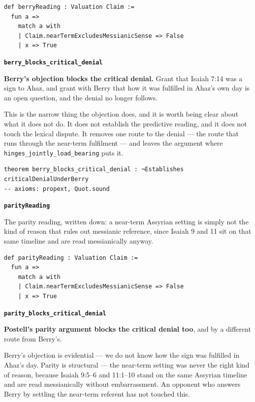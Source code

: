 \documentclass[11pt]{article}
\begin{document}
{\small\begin{verbatim}
def berryReading : Valuation Claim :=
  fun a =>
    match a with
    | Claim.nearTermExcludesMessianicSense => False
    | x => True
\end{verbatim}}
\par\medskip\noindent\textbf{\texttt{berry\_\allowbreak{}blocks\_\allowbreak{}critical\_\allowbreak{}denial}}\par\nobreak\noindent
\textbf{Berry's objection blocks the critical denial.} Grant that Isaiah 7:14 was a sign to Ahaz, and grant with Berry that how it was fulfilled in Ahaz's own day is an open question, and the denial no longer follows.

This is the narrow thing the objection does, and it is worth being clear about what it does not do. It does not establish the predictive reading, and it does not touch the lexical dispute. It removes one route to the denial — the route that runs through the near-term fulfilment — and leaves the argument where \texttt{hinges\_\allowbreak{}jointly\_\allowbreak{}load\_\allowbreak{}bearing} puts it.

{\small\begin{verbatim}
theorem berry_blocks_critical_denial : ¬Establishes criticalDenialUnderBerry
-- axioms: propext, Quot.sound
\end{verbatim}}
\par\medskip\noindent\textbf{\texttt{parity\allowbreak{}Reading}}\par\nobreak\noindent
The parity reading, written down: a near-term Assyrian setting is simply not the kind of reason that rules out messianic reference, since Isaiah 9 and 11 sit on that same timeline and are read messianically anyway.

{\small\begin{verbatim}
def parityReading : Valuation Claim :=
  fun a =>
    match a with
    | Claim.nearTermExcludesMessianicSense => False
    | x => True
\end{verbatim}}
\par\medskip\noindent\textbf{\texttt{parity\_\allowbreak{}blocks\_\allowbreak{}critical\_\allowbreak{}denial}}\par\nobreak\noindent
\textbf{Postell's parity argument blocks the critical denial too}, and by a different route from Berry's.

Berry's objection is evidential — we do not know how the sign was fulfilled in Ahaz's day. Parity is structural — the near-term setting was never the right kind of reason, because Isaiah 9:5–6 and 11:1–10 stand on the same Assyrian timeline and are read messianically without embarrassment. An opponent who answers Berry by settling the near-term referent has not touched this.
\end{document}
